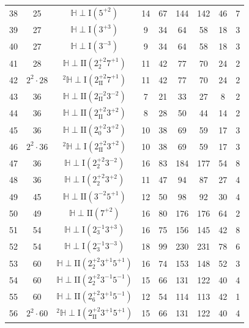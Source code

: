 \documentclass{amsart}
\theoremstyle{definition}
\theoremstyle{remark}
\begin{document}
\begin{center}
\begin{longtable}{c|c|c|c|c|c|c|c|c}
  38 &   25 & $\mathbb{H} \perp \mathrm{I}(5^{+2})$   & 14 & 67 & 144 & 142 & 46 & 7 \\
  39 &  27 & $\mathbb{H} \perp \mathrm{I}(3^{+3})$   & 9 & 34 & 64 & 58 & 18 & 3 \\
  40 &  27 & $\mathbb{H} \perp \mathrm{I}(3^{-3})$   & 9 & 34 & 64 & 58 & 18 & 3 \\
  41 & 28 & $\mathbb{H} \perp \mathrm{II}(2_{2}^{+2}7^{+1})$   & 11 & 42 & 77 & 70 & 24 & 2 \\
  42 & $2^2 \cdot 28$ & ${}^{2}\!{\mathbb{H}} \perp \mathrm{I}(2_{\mathrm{II}}^{+2}7^{+1})$   & 11 & 42 & 77 & 70 & 24 & 2 \\
  43 &  36 & $\mathbb{H} \perp \mathrm{II}(2_{\mathrm{II}}^{-2}3^{-2})$   & 7 & 21 & 33 & 27 & 8 & 2 \\
  44 &  36 & $\mathbb{H} \perp \mathrm{II}(2_{\mathrm{II}}^{+2}3^{+2})$   & 8 & 28 & 50 & 44 & 14 & 2 \\
  45 &  36 & $\mathbb{H} \perp \mathrm{II}(2_{0}^{+2}3^{+2})$   & 10 & 38 & 69 & 59 & 17 & 3 \\
  46 & $2^2 \cdot 36$ & ${}^{2}\!{\mathbb{H}} \perp \mathrm{I}(2_{\mathrm{II}}^{+2}3^{+2})$   & 10 & 38 & 69 & 59 & 17 & 3 \\
  47 &  36 & $\mathbb{H} \perp \mathrm{I}(2_{2}^{+2}3^{-2})$   & 16 & 83 & 184 & 177 & 54 & 8 \\
  48 &  36 & $\mathbb{H} \perp \mathrm{I}(2_{2}^{+2}3^{+2})$   & 11 & 47 & 94 & 87 & 27 & 4 \\
  49 &  45 & $\mathbb{H} \perp \mathrm{II}(3^{-2}5^{+1})$   & 12 & 50 & 98 & 92 & 30 & 4 \\
  50 &  49 & $\mathbb{H} \perp \mathrm{II}(7^{+2})$   & 16 & 80 & 176 & 176 & 64 & 2 \\
  51 &  54 & $\mathbb{H} \perp \mathrm{I}(2_{3}^{-1}3^{+3})$   & 16 & 75 & 156 & 145 & 42 & 8 \\
  52 &   54 & $\mathbb{H} \perp \mathrm{I}(2_{3}^{-1}3^{-3})$   & 18 & 99 & 230 & 231 & 78 & 6 \\
  53 &  60 & $\mathbb{H} \perp \mathrm{II}(2_{2}^{+2}3^{+1}5^{+1})$   & 16 & 74 & 153 & 148 & 52 & 3 \\
  54 &  60 & $\mathbb{H} \perp \mathrm{II}(2_{2}^{+2}3^{-1}5^{-1})$   & 15 & 66 & 131 & 122 & 40 & 4 \\
  55 &  60 & $\mathbb{H} \perp \mathrm{II}(2_{6}^{+2}3^{+1}5^{-1})$   & 12 & 54 & 114 & 113 & 42 & 1 \\
  56 &  $2^2 \cdot 60$ & ${}^{2}\!{\mathbb{H}} \perp \mathrm{I}(2_{\mathrm{II}}^{+2}3^{+1}5^{+1})$   & 15 & 66 & 131 & 122 & 40 & 4 \\

\end{longtable}
\end{center}
\end{document}
